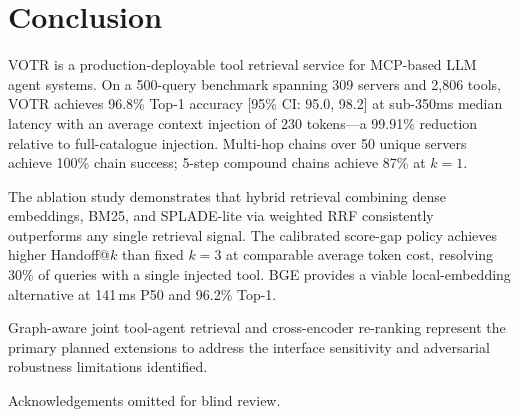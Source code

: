 \documentclass[sigconf,anonymous,review]{acmart}
\newcommand{\votr}{\textsc{VOTR}\xspace}
\begin{document}
\section{Conclusion}

\votr is a production-deployable tool retrieval service for MCP-based LLM agent
systems.
On a 500-query benchmark spanning 309 servers and 2,806 tools, \votr achieves
96.8\% Top-1 accuracy [95\% CI: 95.0, 98.2] at sub-350ms median latency with an
average context injection of 230 tokens---a 99.91\% reduction relative to
full-catalogue injection.
Multi-hop chains over 50 unique servers achieve 100\% chain success; 5-step
compound chains achieve 87\% at $k=1$.

The ablation study demonstrates that hybrid retrieval combining dense embeddings,
BM25, and SPLADE-lite via weighted RRF consistently outperforms any single retrieval
signal.
The calibrated score-gap policy achieves higher Handoff@$k$ than fixed $k=3$ at
comparable average token cost, resolving 30\% of queries with a single injected
tool.
BGE provides a viable local-embedding alternative at 141\,ms P50 and 96.2\% Top-1.

Graph-aware joint tool-agent retrieval and cross-encoder re-ranking represent the
primary planned extensions to address the interface sensitivity and adversarial
robustness limitations identified.

\begin{acks}
Acknowledgements omitted for blind review.
\end{acks}



\end{document}
